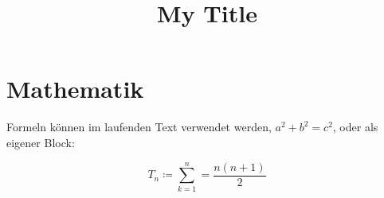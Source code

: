 \documentclass{scrartcl}
\title{My Title}
\begin{document}
\section{Mathematik}

Formeln können im laufenden Text verwendet werden, \(a^2 + b^2 = c^2\),
oder als eigener Block:

\begin{equation}
  T_n \coloneqq \sum^{n}_{k=1} = \frac{n(n+1)}{2}
\end{equation}
\end{document}
